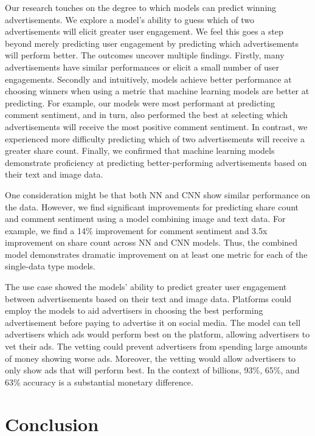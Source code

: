 \documentclass[mksc,blindrev]{informs3} %
\begin{document}
Our research touches on the degree to which models can predict winning advertisements. We explore a model's ability to guess which of two advertisements will elicit greater user engagement. We feel this goes a step beyond merely predicting user engagement by predicting which advertisements will perform better. The outcomes uncover multiple findings. Firstly, many advertisements have similar performances or elicit a small number of user engagements. Secondly and intuitively, models achieve better performance at choosing winners when using a metric that machine learning models are better at predicting. For example, our models were most performant at predicting comment sentiment, and in turn, also performed the best at selecting which advertisements will receive the most positive comment sentiment. In contrast, we experienced more difficulty predicting which of two advertisements will receive a greater share count. Finally, we confirmed that machine learning models demonstrate proficiency at predicting better-performing advertisements based on their text and image data.

One consideration might be that both NN and CNN show similar performance on the data. However, we find significant improvements for predicting share count and comment sentiment using a model combining image and text data. For example, we find a 14\% improvement for comment sentiment and 3.5x improvement on share count across NN and CNN models. Thus, the combined model demonstrates dramatic improvement on at least one metric for each of the single-data type models.

The use case showed the models' ability to predict greater user engagement between advertisements based on their text and image data. Platforms could employ the models to aid advertisers in choosing the best performing advertisement before paying to advertise it on social media. The model can tell advertisers which ads would perform best on the platform, allowing advertisers to vet their ads. The vetting could prevent advertisers from spending large amounts of money showing worse ads. Moreover, the vetting would allow advertisers to only show ads that will perform best. In the context of billions, 93\%, 65\%, and 63\% accuracy is a substantial monetary difference.

\section{Conclusion}
\end{document}
